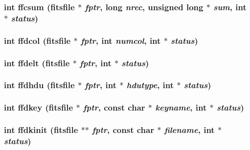 \subsubsection{\setlength{\rightskip}{0pt plus 5cm}int ffcsum (\bf{fitsfile} $\ast$ {\em fptr}, long {\em nrec}, unsigned long $\ast$ {\em sum}, int $\ast$ {\em status})}\label{fitsio_8h_ed833bcd8507fea7a754cf607a386837}


\subsubsection{\setlength{\rightskip}{0pt plus 5cm}int ffdcol (\bf{fitsfile} $\ast$ {\em fptr}, int {\em numcol}, int $\ast$ {\em status})}\label{fitsio_8h_1ff2796da87658614b59e50b787208ad}


\subsubsection{\setlength{\rightskip}{0pt plus 5cm}int ffdelt (\bf{fitsfile} $\ast$ {\em fptr}, int $\ast$ {\em status})}\label{fitsio_8h_02d32917d27a457a77ac003c7c6295dd}


\subsubsection{\setlength{\rightskip}{0pt plus 5cm}int ffdhdu (\bf{fitsfile} $\ast$ {\em fptr}, int $\ast$ {\em hdutype}, int $\ast$ {\em status})}\label{fitsio_8h_8805c9b8c1cc419ceb3e0f9e6779e6c4}


\subsubsection{\setlength{\rightskip}{0pt plus 5cm}int ffdkey (\bf{fitsfile} $\ast$ {\em fptr}, const char $\ast$ {\em keyname}, int $\ast$ {\em status})}\label{fitsio_8h_c07173729eb0c7f54c9b10e14dcc581f}


\subsubsection{\setlength{\rightskip}{0pt plus 5cm}int ffdkinit (\bf{fitsfile} $\ast$$\ast$ {\em fptr}, const char $\ast$ {\em filename}, int $\ast$ {\em status})}\label{fitsio_8h_9d80b85b1dd87a39313c42076dfccdcc}


